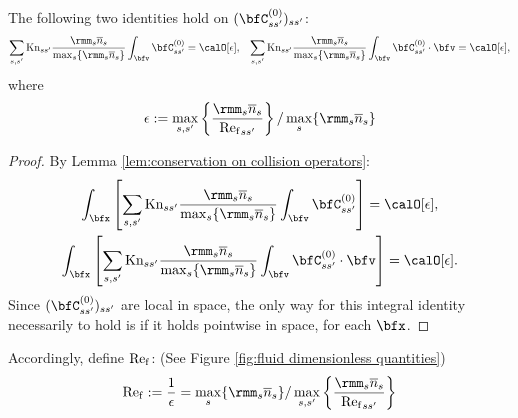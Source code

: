    \begin{lemma}\label{lem:conservation on local collision operators}
        The following two identities hold on $(\bfC_{ss'}^{(0)})_{ss'}$:
        \begin{align}
            \sum_{s, s'}\rmKn_{ss'}\frac{\rmm_{s}\overline{n}_{s}}{\max_{s}\{\rmm_{s}\overline{n}_{s}\}}\int_{\bfv}\bfC_{ss'}^{(0)}  =  \calO[\epsilon],  &&
            \sum_{s, s'}\rmKn_{ss'}\frac{\rmm_{s}\overline{n}_{s}}{\max_{s}\{\rmm_{s}\overline{n}_{s}\}}\int_{\bfv}\bfC_{ss'}^{(0)}\cdot\bfv  =  \calO[\epsilon],
        \end{align}
        where
        \begin{equation}
            \epsilon  :=  \max_{s, s'}\left\{\frac{\rmm_{s}\overline{n}_{s}}{{\rmRef}_{ss'}}\right\}/\max_{s}\{\rmm_{s}\overline{n}_{s}\}
        \end{equation}
    \end{lemma}
    \begin{proof}
        By Lemma \ref{lem:conservation on collision operators}:
        \begin{multline}
            \int_{\bfx}\left[\sum_{s, s'}\rmKn_{ss'}\frac{\rmm_{s}\overline{n}_{s}}{\max_{s}\{\rmm_{s}\overline{n}_{s}\}}\int_{\bfv}\bfC_{ss'}^{(0)}\right]  =  \calO[\epsilon],  \\
            \int_{\bfx}\left[\sum_{s, s'}\rmKn_{ss'}\frac{\rmm_{s}\overline{n}_{s}}{\max_{s}\{\rmm_{s}\overline{n}_{s}\}}\int_{\bfv}\bfC_{ss'}^{(0)}\cdot\bfv\right]  =  \calO[\epsilon].
        \end{multline}
        Since $(\bfC_{ss'}^{(0)})_{ss'}$ are local in space, the only way for this integral identity necessarily to hold is if it holds pointwise in space, for each $\bfx$.
    \end{proof}

    Accordingly, define $\mathrm{Re}_{\mathrm{f}}$: (See Figure \ref{fig:fluid dimensionless quantities})
    \begin{equation}
        \rmRef  :=  \frac{1}{\epsilon}  =  \max_{s}\{\rmm_{s}\overline{n}_{s}\}/\max_{s, s'}\left\{\frac{\rmm_{s}\overline{n}_{s}}{{\rmRef}_{ss'}}\right\}
    \end{equation}

